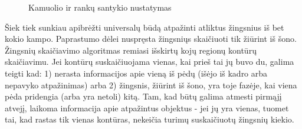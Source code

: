 \documentclass{VUMIFPSbakalaurinis}
\begin{document}
\begin{figure}[H]
	\centering
	\qquad
	\qquad
	\qquad
	\caption{Kamuolio ir rankų santykio nustatymas}
	\label{fig:hand_and_ball}
\end{figure}

Šiek tiek sunkiau apibrėžti universalų būdą atpažinti atliktus žingsnius iš bet kokio kampo. Paprastumo dėlei nuspręsta žingsniųs skaičiuoti tik žiūrint iš šono. Žingsnių skaičiavimo algoritmas remiasi išskirtų kojų regionų kontūrų skaičiavimu. Jei kontūrų suskaičiuojama vienas, kai prieš tai jų buvo du, galima teigti kad: 1) nerasta informacijos apie vieną iš pėdų (išėjo iš kadro arba nepavyko atpažinimas) arba 2) žingsnis, žiūrint iš šono, yra toje fazėje, kai viena pėda pridengia (arba yra netoli) kitą. Tam, kad būtų galima atmesti pirmąjį atvejį, laikoma informacija apie atpažintus objektus - jei jų yra vienas, tuomet tai, kad rastas tik vienas kontūras, nekeičia turimų suskaičiuotų žingsnių kiekio. 
\end{document}
